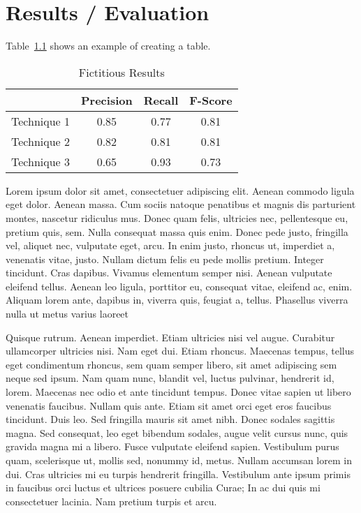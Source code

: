 
\chapter{Results / Evaluation}\label{ch:results}

Table~\ref{tab:example} shows an example of creating a table.

\begin{table}[h]
	\caption{Fictitious Results}
	\label{tab:example}
	\centering
	\begin{tabular}{l c c c }
		\hline
		& \textbf{Precision} & \textbf{Recall} & \textbf{F-Score} \\ \hline
		Technique 1 & 0.85 & 0.77 & 0.81 \\
		Technique 2 & 0.82 & 0.81 & 0.81 \\
	         Technique 3 & 0.65 & 0.93 & 0.73 \\ \hline
	\end{tabular}
\end{table}

Lorem ipsum dolor sit amet, consectetuer adipiscing elit. Aenean commodo ligula eget dolor. Aenean massa. Cum sociis natoque penatibus et magnis dis parturient montes, nascetur ridiculus mus. Donec quam felis, ultricies nec, pellentesque eu, pretium quis, sem. Nulla consequat massa quis enim. Donec pede justo, fringilla vel, aliquet nec, vulputate eget, arcu. In enim justo, rhoncus ut, imperdiet a, venenatis vitae, justo. Nullam dictum felis eu pede mollis pretium. Integer tincidunt. Cras dapibus. Vivamus elementum semper nisi. Aenean vulputate eleifend tellus. Aenean leo ligula, porttitor eu, consequat vitae, eleifend ac, enim. Aliquam lorem ante, dapibus in, viverra quis, feugiat a, tellus. Phasellus viverra nulla ut metus varius laoreet

Quisque rutrum. Aenean imperdiet. Etiam ultricies nisi vel augue. Curabitur ullamcorper ultricies nisi. Nam eget dui. Etiam rhoncus. Maecenas tempus, tellus eget condimentum rhoncus, sem quam semper libero, sit amet adipiscing sem neque sed ipsum. Nam quam nunc, blandit vel, luctus pulvinar, hendrerit id, lorem. Maecenas nec odio et ante tincidunt tempus. Donec vitae sapien ut libero venenatis faucibus. Nullam quis ante. Etiam sit amet orci eget eros faucibus tincidunt. Duis leo. Sed fringilla mauris sit amet nibh. Donec sodales sagittis magna. Sed consequat, leo eget bibendum sodales, augue velit cursus nunc, quis gravida magna mi a libero. Fusce vulputate eleifend sapien. Vestibulum purus quam, scelerisque ut, mollis sed, nonummy id, metus. Nullam accumsan lorem in dui. Cras ultricies mi eu turpis hendrerit fringilla. Vestibulum ante ipsum primis in faucibus orci luctus et ultrices posuere cubilia Curae; In ac dui quis mi consectetuer lacinia. Nam pretium turpis et arcu. 

